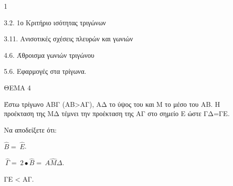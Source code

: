 \begin{ylh}{1}
    \item 3.2. 1ο Κριτήριο ισότητας τριγώνων
    \item 3.11. Ανισοτικές σχέσεις πλευρών και γωνιών
    \item 4.6. Άθροισμα γωνιών τριγώνου
    \item 5.6. Εφαρμογές στα τρίγωνα.
\end{ylh}

ΘΕΜΑ 4

Έστω τρίγωνο ΑΒΓ (ΑΒ\textgreater ΑΓ), ΑΔ το ύψος του και Μ το μέσο του ΑΒ. Η προέκταση της ΜΔ τέμνει την προέκταση της ΑΓ στο σημείο Ε ώστε ΓΔ=ΓΕ.

Να αποδείξετε ότι:

\begin{alist}
\item $\widehat{Β} = \ \widehat{Ε}$. 

\item $\ \widehat{\Gamma} = \ 2 \bullet \widehat{Β} = \ Α\widehat{Μ}\Delta$. 

\item ΓΕ \textless{} ΑΓ. 


\end{alist}
